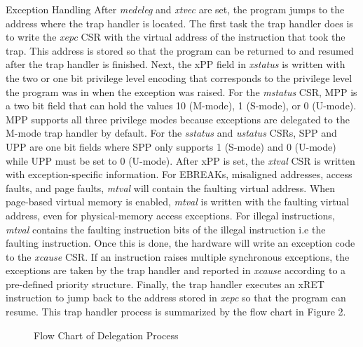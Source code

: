 \documentclass[12pt]{article}
\begin{document}
\begin{section}{Exception Handling}
After \emph{medeleg} and \emph{xtvec} are set, the program jumps to the address where the trap handler is located. The first task the trap handler does is to write the \emph{xepc} CSR with the virtual address of the instruction that took the trap. This address is stored so that the program can be returned to and resumed after the trap handler is finished. Next, the xPP field in \emph{xstatus} is written with the two or one bit privilege level encoding that corresponds to the privilege level the program was in when the exception was raised. For the \emph{mstatus} CSR, MPP is a two bit field that can hold the values 10 (M-mode), 1 (S-mode), or 0 (U-mode). MPP supports all three privilege modes because exceptions are delegated to the M-mode trap handler by default. For the \emph{sstatus} and \emph{ustatus} CSRs, SPP and UPP are one bit fields where SPP only supports 1 (S-mode) and 0 (U-mode) while UPP must be set to 0 (U-mode). After xPP is set, the \emph{xtval} CSR is written with exception-specific information. For EBREAKs, misaligned addresses, access faults, and page faults, \emph{mtval} will contain the faulting virtual address. When page-based virtual memory is enabled, \emph{mtval} is written with the faulting virtual address, even for physical-memory access exceptions. For illegal instructions, \emph{mtval} contains the faulting instruction bits of the illegal instruction i.e the faulting instruction. Once this is done, the hardware will write an exception code to the \emph{xcause} CSR. If an instruction raises multiple synchronous exceptions, the exceptions are taken by the trap handler and reported in \emph{xcause} according to a pre-defined priority structure. Finally, the trap handler executes an xRET instruction to jump back to the address stored in \emph{xepc} so that the program can resume. This trap handler process is summarized by the flow chart in Figure 2.   
\end{section}

\begin{figure}
\centering
{}
\caption{Flow Chart of Delegation Process}
\end{figure}
\end{document}
